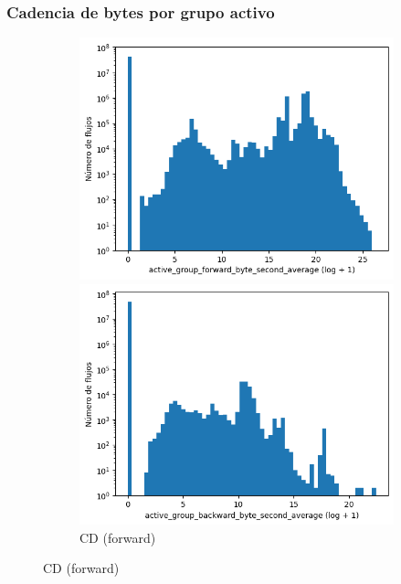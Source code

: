 \subsubsection{Cadencia de bytes por grupo activo}

\begin{figure}[H]
    \centering
    \begin{subfigure}[b]{0.26\textwidth}
        \centering
        \includegraphics[width=\textwidth]{media/packet_pincer_cicddos/active_group_forward_byte_second_average_log_x_log_y.png}
        \caption{CD (forward)}
        \includegraphics[width=\textwidth]{media/packet_pincer_cicddos/active_group_backward_byte_second_average_log_x_log_y.png}

\end{subfigure}
\end{figure}
